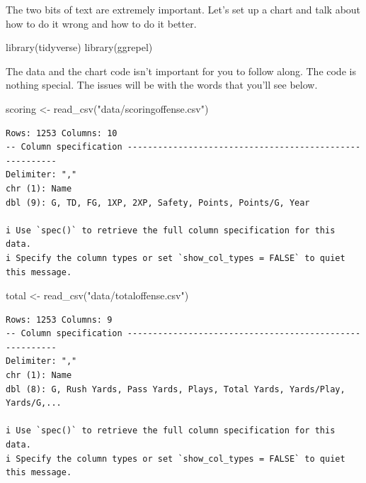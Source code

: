 \documentclass[
  letterpaper,
  DIV=11,
  numbers=noendperiod]{scrreprt}
\newenvironment{Shaded}{\begin{snugshade}}{\end{snugshade}}
\newcommand{\FunctionTok}[1]{\textcolor[rgb]{0.28,0.35,0.67}{#1}}
\newcommand{\NormalTok}[1]{\textcolor[rgb]{0.00,0.23,0.31}{#1}}
\newcommand{\OtherTok}[1]{\textcolor[rgb]{0.00,0.23,0.31}{#1}}
\newcommand{\StringTok}[1]{\textcolor[rgb]{0.13,0.47,0.30}{#1}}
\begin{document}
The two bits of text are extremely important. Let's set up a chart and
talk about how to do it wrong and how to do it better.

\begin{Shaded}
\begin{Highlighting}[]
\FunctionTok{library}\NormalTok{(tidyverse)}
\FunctionTok{library}\NormalTok{(ggrepel)}
\end{Highlighting}
\end{Shaded}

The data and the chart code isn't important for you to follow along. The
code is nothing special. The issues will be with the words that you'll
see below.

\begin{Shaded}
\begin{Highlighting}[]
\NormalTok{scoring }\OtherTok{\textless{}{-}} \FunctionTok{read\_csv}\NormalTok{(}\StringTok{"data/scoringoffense.csv"}\NormalTok{)}
\end{Highlighting}
\end{Shaded}

\begin{verbatim}
Rows: 1253 Columns: 10
-- Column specification --------------------------------------------------------
Delimiter: ","
chr (1): Name
dbl (9): G, TD, FG, 1XP, 2XP, Safety, Points, Points/G, Year

i Use `spec()` to retrieve the full column specification for this data.
i Specify the column types or set `show_col_types = FALSE` to quiet this message.
\end{verbatim}

\begin{Shaded}
\begin{Highlighting}[]
\NormalTok{total }\OtherTok{\textless{}{-}} \FunctionTok{read\_csv}\NormalTok{(}\StringTok{"data/totaloffense.csv"}\NormalTok{)}
\end{Highlighting}
\end{Shaded}

\begin{verbatim}
Rows: 1253 Columns: 9
-- Column specification --------------------------------------------------------
Delimiter: ","
chr (1): Name
dbl (8): G, Rush Yards, Pass Yards, Plays, Total Yards, Yards/Play, Yards/G,...

i Use `spec()` to retrieve the full column specification for this data.
i Specify the column types or set `show_col_types = FALSE` to quiet this message.
\end{verbatim}
\end{document}
